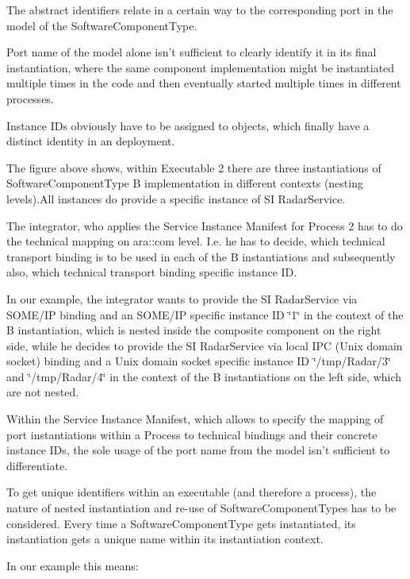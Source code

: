 \begin{DoxyItemize}
\item The abstract identifiers relate in a certain way to the corresponding port in the model of the Software\+Component\+Type.
\item Port name of the model alone isn’t sufficient to clearly identify it in its final instantiation, where the same component implementation might be instantiated multiple times in the code and then eventually started multiple times in different processes.
\item Instance I\+Ds obviously have to be assigned to objects, which finally have a distinct identity in an deployment. 
\item The figure above shows, within Executable 2 there are three instantiations of Software\+Component\+Type B implementation in different contexts (nesting levels).All instances do provide a specific instance of SI Radar\+Service.
\item The integrator, who applies the Service Instance Manifest for Process 2 has to do the technical mapping on ara\+::com level. I.\+e. he has to decide, which technical transport binding is to be used in each of the B instantiations and subsequently also, which technical transport binding specific instance ID.
\item In our example, the integrator wants to provide the SI Radar\+Service via S\+O\+M\+E/\+IP binding and an S\+O\+M\+E/\+IP specific instance ID \char`\"{}1\char`\"{} in the context of the B instantiation, which is nested inside the composite component on the right side, while he decides to provide the SI Radar\+Service via local I\+PC (Unix domain socket) binding and a Unix domain socket specific instance ID \char`\"{}/tmp/\+Radar/3\char`\"{} and \char`\"{}/tmp/\+Radar/4\char`\"{} in the context of the B instantiations on the left side, which are not nested.
\item Within the Service Instance Manifest, which allows to specify the mapping of port instantiations within a Process to technical bindings and their concrete instance I\+Ds, the sole usage of the port name from the model isn’t sufficient to differentiate.
\item To get unique identifiers within an executable (and therefore a process), the nature of nested instantiation and re-\/use of Software\+Component\+Types has to be considered. Every time a Software\+Component\+Type gets instantiated, its instantiation gets a unique name within its instantiation context.
\item In our example this means\+:

\end{DoxyItemize}

